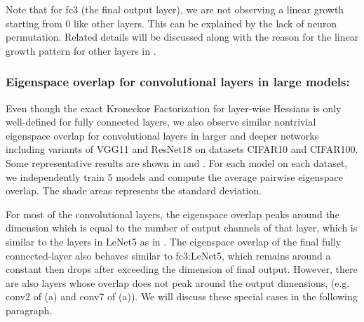 Note that for fc3 (the final output layer), we are not observing a linear growth starting from 0 like other layers. This can be explained by the lack of neuron permutation. Related details will be discussed along with the reason for the linear growth pattern for other layers in .

\subsubsection{Eigenspace overlap for convolutional layers in large models:}
Even though the exact Kroneckor Factorization for layer-wise Hessians is only well-defined for fully connected layers, we also observe similar nontrivial eigenspace overlap for convolutional layers in larger and deeper networks including variants of VGG11 and ResNet18 on datasets CIFAR10 and CIFAR100. Some representative results are shown in  and . For each model on each dataset, we independently train 5 models and compute the average pairwise eigenspace overlap. The shade areas represents the standard deviation.
 
For most of the convolutional layers, the eigenspace overlap peaks around the dimension which is equal to the number of output channels of that layer, which is similar to the layers in LeNet5 as in . The eigenspace overlap of the final fully connected-layer also behaves similar to fc3:LeNet5, which remains around a constant then drops after exceeding the dimension of final output.
However, there are also layers whose overlap does not peak around the output dimensions, (e.g. conv2 of (a) and conv7 of (a)). We will discuss these special cases in the following paragraph.


